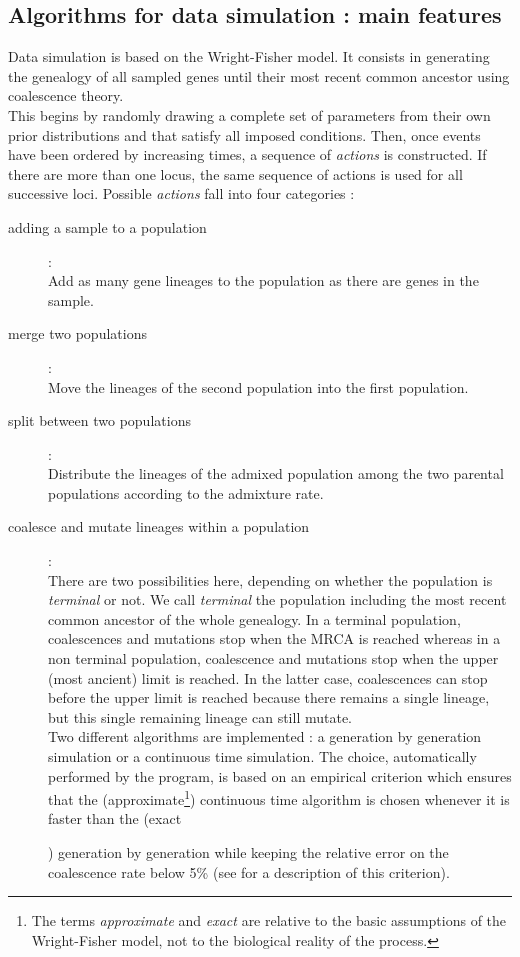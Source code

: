 \subsection{Algorithms for data simulation : main features}
Data simulation is based on the Wright-Fisher model. It consists in generating the genealogy of all sampled genes until their most recent common ancestor using coalescence theory.\\ 
This begins by randomly drawing a complete set of
parameters from their own prior distributions and that satisfy all imposed conditions. 
Then, once events have been ordered by increasing times, a sequence
of \emph{actions} is constructed. If there are more than one locus,
the same sequence of actions is used for all successive loci.
Possible \emph{actions} fall into four categories :
\begin{description}
  \item[adding a sample to a population] :\\
Add as many gene lineages to the population as there are genes in
the sample.
  \item[merge two populations] : \\
Move the lineages of the second population into the first
population.
  \item[split between two populations]: \\ Distribute the lineages of the admixed population among the two
parental populations according to the admixture rate.
  \item[coalesce and mutate lineages within a population]: \\
There are two possibilities here, depending on whether the
population is \emph{terminal} or not. We call \emph{terminal} the
population including the most recent common ancestor of the whole
genealogy. In a terminal population, coalescences and mutations stop
when the MRCA is reached whereas in a non terminal population,
coalescence and mutations stop when the upper (most ancient) limit
is reached. In the latter case, coalescences can stop before the
upper limit is
reached because there remains a single lineage, but this single remaining lineage can still mutate.\\
Two different algorithms are implemented : a
generation by generation simulation or a continuous time simulation.
The choice, automatically performed by the program, is based on an empirical criterion which ensures that the (approximate\footnote{The terms \emph{approximate} and \emph{exact} are relative to the basic assumptions of the Wright-Fisher model, not to the biological reality of the process.}) continuous time algorithm is chosen whenever it is faster than the (exact\addtocounter{footnote}{-1}\footnotemark) generation by generation while keeping the relative error on the coalescence rate below 5\% (see  \citet{C2008} for a description of this criterion).\\

\end{description}
